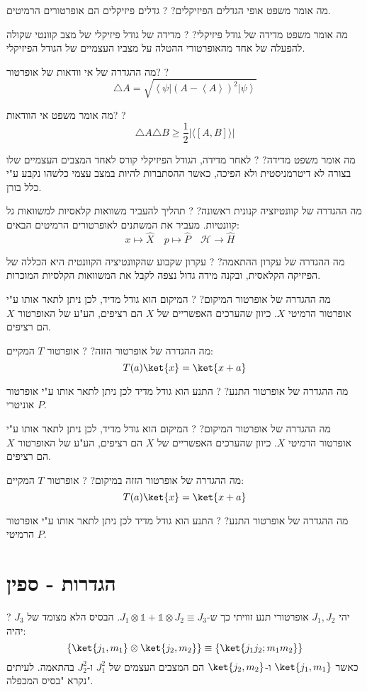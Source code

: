 \documentclass{tstextbook}
\begin{document}
מה אומר משפט אופי הגדלים הפיזיקלים?
?
גדלים פיזיקלים הם אופרטורים הרמיטים.

מה אומר משפט מדידה של גודל פיזיקלי?
?
מדידה של גודל פיזיקלי של מצב קוונטי שקולה להפעלה של אחד מהאופרטורי ההטלה על מצביו העצמיים של הגודל הפיזיקלי.

מה ההגדרה של אי וודאות של אופרטור?
?
$$\triangle A = \sqrt{\left\langle\psi\right|\left(A-\left\langle A\right\rangle\right)^{2}\left|\psi\right\rangle}$$

מה אומר משפט אי הוודאות?
?
$$\triangle A \triangle B \geq \frac{1}{2}\left\lvert  \langle [A,B] \rangle   \right\rvert $$

מה אומר משפט מדידה?
?
לאחר מדידה, הגודל הפיזיקלי קורס לאחד המצבים העצמיים שלו בצורה לא דיטרמניסטית ולא הפיכה, כאשר ההסתברות להיות במצב עצמי כלשהו נקבע ע"י כלל בורן.

מה ההגדרה של קוונטיזציה קנונית ראשונה?
?
תהליך להעביר משוואות קלאסיות למשוואות גל קוונטיות. מעביר את המשתנים לאופרטורים הרמיטים הבאים:
$$x\mapsto \hat{X}\quad p\mapsto \hat{P}\quad \mathcal{H}\to \hat{H}\quad $$

מה ההגדרה של עקרון ההתאמה?
?
עקרון שקבוע שהקוונטיציה הקוונטית היא הכללה של הפיזיקה הקלאסית, ובקנה מידה גדול נצפה לקבל את המשוואות הקלסיות המוכרות.

מה ההגדרה של אופרטור המיקום?
?
המיקום הוא גודל מדיד, לכן ניתן לתאר אותו ע"י אופרטור הרמיטי \(X\). כיוון שהערכים האפשריים של \(X\) הם רציפים, הע"ע של האופרטור \(X\) הם רציפים.

מה ההגדרה של אופרטור הזזה?
?
אופרטור \(T\) המקיים:
$$T(a)\ket{x} = \ket{x+a}$$

מה ההגדרה של אופרטור התנע?
?
התנע הוא גודל מדיד לכן ניתן לתאר אותו ע"י אופרטור אוניטרי \(P\).

מה ההגדרה של אופרטור המיקום?
?
המיקום הוא גודל מדיד, לכן ניתן לתאר אותו ע"י אופרטור הרמיטי \(X\). כיוון שהערכים האפשריים של \(X\) הם רציפים, הע"ע של האופרטור \(X\) הם רציפים.

מה ההגדרה של אופרטור הזזה במיקום?
?
אופרטור \(T\) המקיים:
$$T(a)\ket{x} = \ket{x+a}$$

מה ההגדרה של אופרטור התנע?
?
התנע הוא גודל מדיד לכן ניתן לתאר אותו ע"י אופרטור הרמיטי \(P\).

\section{הגדרות - ספין}

?
יהי \(J_{1},J_{2}\) אופרטורי תנע זוויתי כך ש-\(J_{1}\otimes \mathbb{1} +\mathbb{1} \otimes J_{2}\equiv J_{3}\). הבסיס הלא מצומד של \(J_{3}\) יהיה:
$$\left\{  \ket{j_{1},m_{1}} \otimes \ket{j_{2},m_{2}}   \right\}\equiv \left\{  \ket{j_{1}j_{2};m_{1}m_{2}}   \right\}$$
כאשר \(\ket{j_{1},m_{1}}\) ו-\(\ket{j_{2},m_{2}}\) הם המצבים העצמים של \(J_{1}^{2}\) ו-\(J_{2}^{2}\) בהתאמה. לעיתים נקרא "בסיס המכפלה".
\end{document}

